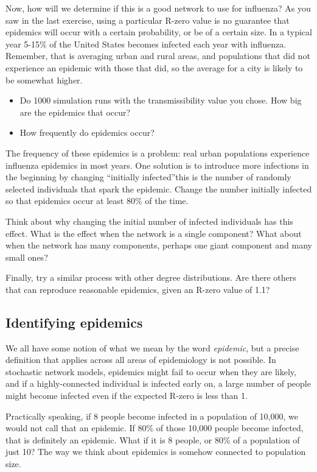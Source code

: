 \documentclass{article}
\begin{document}
Now, how will we determine if this is a good network to use for influenza?  As you saw in the last exercise, using a particular R-zero value is no guarantee that epidemics will occur with a certain probability, or be of a certain size.  In a typical year 5-15\% of the United States becomes infected each year with influenza.  Remember, that is averaging urban and rural areas, and populations that did not experience an epidemic with those that did, so the average for a city is likely to be somewhat higher.
\begin{itemize}
 \item Do 1000 simulation runs with the transmissibility value you chose.  How big are the epidemics that occur?

 \item How frequently do epidemics occur?
\end{itemize}

The frequency of these epidemics is a problem: real urban populations experience influenza epidemics in most years.  One solution is to introduce more infections in the beginning by changing ``initially infected''\textemdash this is the number of randomly selected individuals that spark the epidemic.  Change the number initially infected so that epidemics occur at least 80\% of the time.

Think about why changing the initial number of infected individuals has this effect.  What is the effect when the network is a single component?  What about when the network has many components, perhaps one giant component and many small ones?

Finally, try a similar process with other degree distributions.  Are there others that can reproduce reasonable epidemics, given an R-zero value of 1.1?


\subsection{Identifying epidemics}
We all have some notion of what we mean by the word \textit{epidemic}, but a precise definition that applies across all areas of epidemiology is not possible.  In stochastic network models, epidemics might fail to occur when they are likely, and if a highly-connected individual is infected early on, a large number of people might become infected even if the expected R-zero is less than 1.

Practically speaking, if 8 people become infected in a population of 10,000, we would not call that an epidemic.  If 80\% of those 10,000 people become infected, that is definitely an epidemic.  What if it is 8 people, or 80\% of a population of just 10?  The way we think about epidemics is somehow connected to population size.
\end{document}
